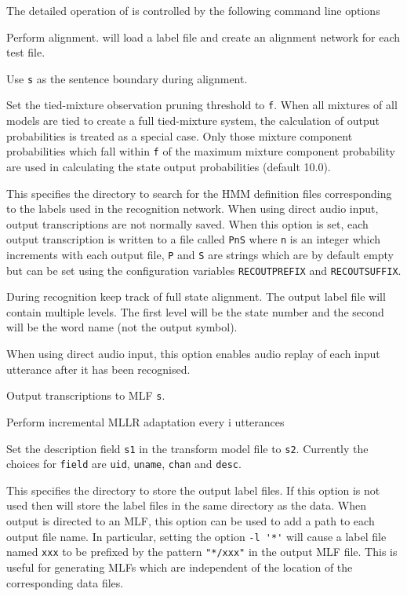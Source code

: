 The detailed operation of  is controlled by the following
command line options
\begin{optlist}

   Perform alignment.   will load a label file and
        create an alignment network for each test file.

   Use \texttt{s} as the sentence boundary during alignment.
  
   Set the tied-mixture observation pruning threshold to \texttt{f}.
        When all mixtures of all models are tied to create a full
        tied-mixture system, the calculation of output probabilities
        is treated as a special case.  Only those mixture 
        component probabilities which fall within \texttt{f} of
        the maximum mixture component probability are used in calculating
        the state output probabilities (default 10.0).

   This specifies the directory to search for the
        HMM definition files corresponding to the labels used in
        the recognition network.
   When using direct audio input, output transcriptions
        are not normally saved.  When this option is set, each
        output transcription is written to a file called \texttt{PnS}
        where \texttt{n} is an integer which increments with each output
        file, \texttt{P} and \texttt{S} are strings which are by default
        empty but can be set using the configuration variables
        \texttt{RECOUTPREFIX} and \texttt{RECOUTSUFFIX}.

 During recognition keep track of full state alignment. The output
        label file will contain multiple levels. The first level will be the 
        state number and the second will be the word name (not the output symbol).

   When using direct audio input, this option enables audio
        replay of each input utterance after it has been recognised.

   Output transcriptions to MLF \texttt{s}.

   Perform incremental MLLR adaptation every i utterances      

   Set the description field {\tt s1} in the
        transform model file to {\tt s2}. Currently the choices for
        {\tt field} are {\tt uid}, {\tt uname}, {\tt chan} and {\tt desc}.

   This specifies the directory to store the  output label 
        files.  If this option is not used then  will store 
        the label files in the same directory as the data.
      When output is directed to an MLF, this option can be used to
      add a path to each output file name.  In particular, setting the option
      \verb+-l '*'+ will cause a label file named \texttt{xxx} to be prefixed
      by the pattern \verb+"*/xxx"+ in the output MLF file.  This is useful
      for generating MLFs which are independent of the location of the 
      corresponding data files.


\end{optlist}
